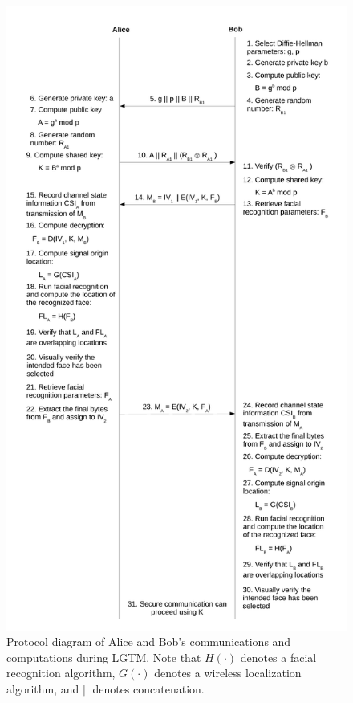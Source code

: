 \documentclass[12pt]{report}
\begin{document}
\begin{figure}[!hp]
    \begin{center}
        \caption{Protocol diagram of Alice and Bob's communications and computations during LGTM. Note that $H(\cdot)$ denotes a facial recognition algorithm, $G(\cdot)$ denotes a wireless localization algorithm, and $||$ denotes concatenation.}
        \label{figure: protocol-diagram}
        \includegraphics[scale=0.35]{../figures/looks-good-to-me-protocol-diagram.pdf}
    \end{center}
\end{figure}
\end{document}
